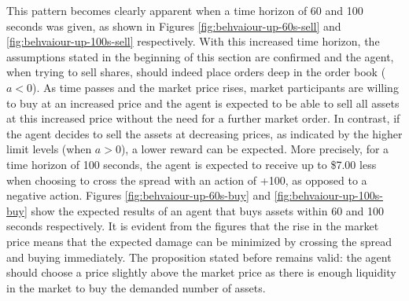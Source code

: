 This pattern becomes clearly apparent when a time horizon of 60 and 100 seconds was given, as shown in Figures \ref{fig:behvaiour-up-60s-sell} and \ref{fig:behvaiour-up-100s-sell} respectively.
With this increased time horizon, the assumptions stated in the beginning of this section are confirmed and the agent, when trying to sell shares, should indeed place orders deep in the order book ($a<0$).
As time passes and the market price rises, market participants are willing to buy at an increased price and the agent is expected to be able to sell all assets at this increased price without the need for a further market order.
In contrast, if the agent decides to sell the assets at decreasing prices, as indicated by the higher limit levels (when $a>0$), a lower reward can be expected.
More precisely, for a time horizon of 100 seconds, the agent is expected to receive up to \$7.00 less when choosing to cross the spread with an action of +100, as opposed to a negative action.
Figures \ref{fig:behvaiour-up-60s-buy} and \ref{fig:behvaiour-up-100s-buy} show the expected results of an agent that buys assets within 60 and 100 seconds respectively.
It is evident from the figures that the rise in the market price means that the expected damage can be minimized by crossing the spread and buying immediately.
The proposition stated before remains valid: the agent should choose a price slightly above the market price as there is enough liquidity in the market to buy the demanded number of assets.

